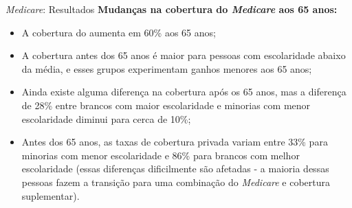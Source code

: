 \documentclass[aspectratio=1610, 10pt]{beamer}
\begin{document}


\begin{frame}{\textit{Medicare}: Resultados}
    \textbf{Mudanças na cobertura do \textit{Medicare} aos 65 anos:}
    \begin{itemize}
        \item A cobertura do aumenta em 60\% aos 65 anos;
        \item A cobertura antes dos 65 anos é maior para pessoas com escolaridade abaixo da média, e esses grupos experimentam ganhos menores aos 65 anos;
        \item Ainda existe alguma diferença na cobertura após os 65 anos, mas a diferença de 28\% entre brancos com maior escolaridade e minorias com menor escolaridade diminui para cerca de 10\%;
        \item Antes dos 65 anos, as taxas de cobertura privada variam entre 33\% para minorias com menor escolaridade e 86\% para brancos com melhor escolaridade (essas diferenças dificilmente são afetadas - a maioria dessas pessoas fazem a transição para uma combinação do \textit{Medicare} e cobertura suplementar).
    \end{itemize}
\end{frame}
\end{document}
